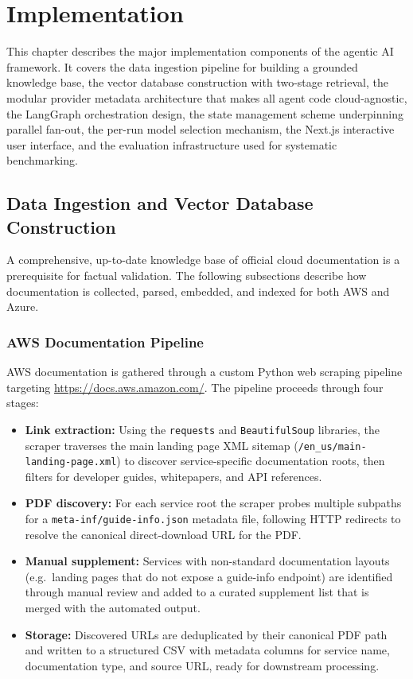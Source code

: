 \chapter{Implementation}

This chapter describes the major implementation components of the agentic AI framework. It covers the data ingestion pipeline for building a grounded knowledge base, the vector database construction with two-stage retrieval, the modular provider metadata architecture that makes all agent code cloud-agnostic, the LangGraph orchestration design, the state management scheme underpinning parallel fan-out, the per-run model selection mechanism, the Next.js interactive user interface, and the evaluation infrastructure used for systematic benchmarking.

\section{Data Ingestion and Vector Database Construction}

A comprehensive, up-to-date knowledge base of official cloud documentation is a prerequisite for factual validation. The following subsections describe how documentation is collected, parsed, embedded, and indexed for both AWS and Azure.

\subsection{AWS Documentation Pipeline}

AWS documentation is gathered through a custom Python web scraping pipeline targeting \url{https://docs.aws.amazon.com/}. The pipeline proceeds through four stages:

\begin{itemize}
    \item \textbf{Link extraction:} Using the \texttt{requests} and \texttt{BeautifulSoup} libraries, the scraper traverses the main landing page XML sitemap (\texttt{/en\_us/main-landing-page.xml}) to discover service-specific documentation roots, then filters for developer guides, whitepapers, and API references.
    \item \textbf{PDF discovery:} For each service root the scraper probes multiple subpaths for a \texttt{meta-inf/guide-info.json} metadata file, following HTTP redirects to resolve the canonical direct-download URL for the PDF.
    \item \textbf{Manual supplement:} Services with non-standard documentation layouts (e.g.\ landing pages that do not expose a guide-info endpoint) are identified through manual review and added to a curated supplement list that is merged with the automated output.
    \item \textbf{Storage:} Discovered URLs are deduplicated by their canonical PDF path and written to a structured CSV with metadata columns for service name, documentation type, and source URL, ready for downstream processing.
\end{itemize}

